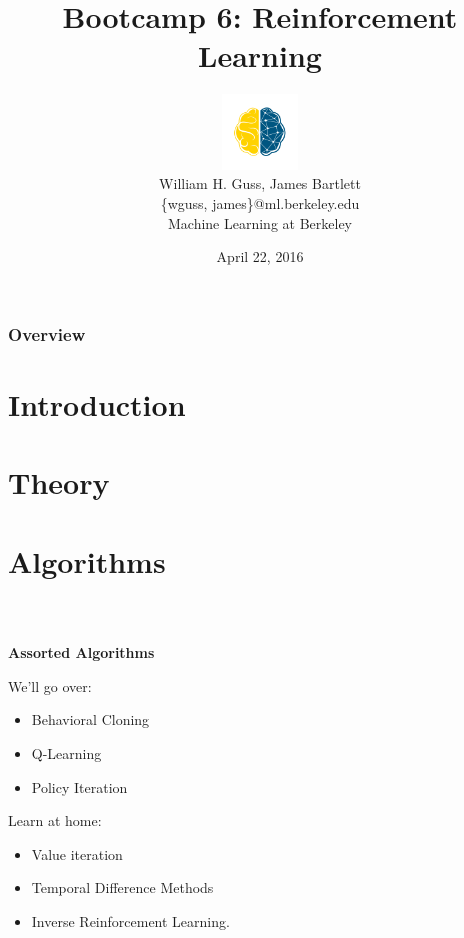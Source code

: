 \documentclass[table]{beamer}
\title[Reinforcement Learning]{Bootcamp 6: Reinforcement Learning}
\author[Guss \& Bartlett]{\includegraphics[height=2cm,width=2cm]{BlueGold_fill_small.png}\\   William H. Guss, James Bartlett\\\{wguss, james\}@ml.berkeley.edu\\Machine Learning at Berkeley}
\date{April 22, 2016} %
\numberwithin{equation}{subsection}
\numberwithin{theorem}{subsection}
\begin{document}
  

\begin{frame}{}
\titlepage
\end{frame}



\begin{frame}

\frametitle{Overview}
\tableofcontents
\end{frame}


\section{Introduction}


\section{Theory}



\section{Algorithms}
\begin{frame}
\frametitle{$\ $}
  \begin{center}
    \Huge{\textbf{Assorted Algorithms}
    }
  \end{center}
  We'll go over:
  \begin{itemize}
    \item Behavioral Cloning
    \item Q-Learning
    \item Policy Iteration
  \end{itemize}
  
  Learn at home:
  \begin{itemize}
    \item Value iteration
    \item Temporal Difference Methods
    \item Inverse Reinforcement Learning.
  \end{itemize}

\end{frame}
\end{document}
